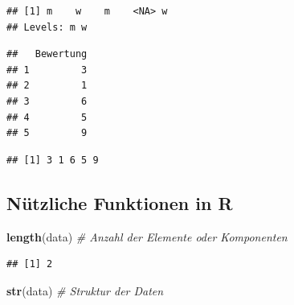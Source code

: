 \documentclass[10pt,ngerman,onside]{article}
\newenvironment{Shaded}{\begin{snugshade}}{\end{snugshade}}
\newcommand{\KeywordTok}[1]{\textcolor[rgb]{0.13,0.29,0.53}{\textbf{#1}}}
\newcommand{\DecValTok}[1]{\textcolor[rgb]{0.00,0.00,0.81}{#1}}
\newcommand{\StringTok}[1]{\textcolor[rgb]{0.31,0.60,0.02}{#1}}
\newcommand{\CommentTok}[1]{\textcolor[rgb]{0.56,0.35,0.01}{\textit{#1}}}
\newcommand{\OperatorTok}[1]{\textcolor[rgb]{0.81,0.36,0.00}{\textbf{#1}}}
\newcommand{\NormalTok}[1]{#1}
\begin{document}
\begin{verbatim}
## [1] m    w    m    <NA> w   
## Levels: m w
\end{verbatim}

\begin{Shaded}
\end{Shaded}

\begin{verbatim}
##   Bewertung
## 1         3
## 2         1
## 3         6
## 4         5
## 5         9
\end{verbatim}

\begin{Shaded}
\end{Shaded}

\begin{verbatim}
## [1] 3 1 6 5 9
\end{verbatim}

\hypertarget{nutzliche-funktionen-in-r}{%
\subsection{Nützliche Funktionen in R}\label{nutzliche-funktionen-in-r}}

\begin{Shaded}
\begin{Highlighting}[]
\KeywordTok{length}\NormalTok{(data) }\CommentTok{# Anzahl der Elemente oder Komponenten}
\end{Highlighting}
\end{Shaded}

\begin{verbatim}
## [1] 2
\end{verbatim}

\begin{Shaded}
\begin{Highlighting}[]
\KeywordTok{str}\NormalTok{(data) }\CommentTok{# Struktur der Daten}
\end{Highlighting}
\end{Shaded}
\end{document}
